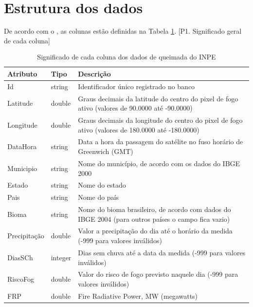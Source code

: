 \documentclass[cic,tc]{iiufrgs}
\begin{document}
\section{Estrutura dos dados}

De acordo com o \citep{PerguntasFrequentesINPE}, as colunas estão definidas
na Tabela \ref{table:inpeColumns}. [P1. Significado geral de cada coluna]

\begin{table}[h!]
\centering
\begin{tabular}{ | l l p{10cm} | }
\hline
 Atributo & Tipo & Descrição \\
\hline
 Id & string & Identificador único registrado no banco \\
  \hline
 Latitude & double & Graus decimais da latitude do centro do pixel de 
                     fogo ativo (valores de 90.0000 até -90.0000) \\ 
  \hline
 Longitude & double & Graus decimais da longitude do centro do pixel de 
                      fogo ativo (valores de 180.0000 até -180.0000) \\  
  \hline
 DataHora & string & Data a hora da passagem do satélite no fuso 
                     horário de Greenwich (GMT) \\   
  \hline
 Municipio & string & Nome do município, de acordo com os dados do IBGE 2000 \\
  \hline
 Estado & string & Nome do estado \\
  \hline
 Pais & string & Nome do país \\  
  \hline
 Bioma & string & Nome do bioma brasileiro, de acordo com dados do IBGE 2004 
                  (para outros países o campo fica vazio) \\
  \hline
 Precipitação & double & Valor a precipitação do dia até o horário da medida
                         (-999 para valores inválidos) \\
  \hline
 DiasSCh & integer & Dias sem chuva até a data da medida 
                     (-999 para valores inválidos) \\
  \hline
  RiscoFog & double & Valor do risco de fogo previsto naquele dia 
                      (-999 para valores inválidos) \\
  \hline
  FRP & double & Fire Radiative Power, MW (megawatts) \\
 \hline
\end{tabular}
\caption{Significado de cada coluna dos dados de queimada do INPE}
\label{table:inpeColumns}
\end{table}
\end{document}
